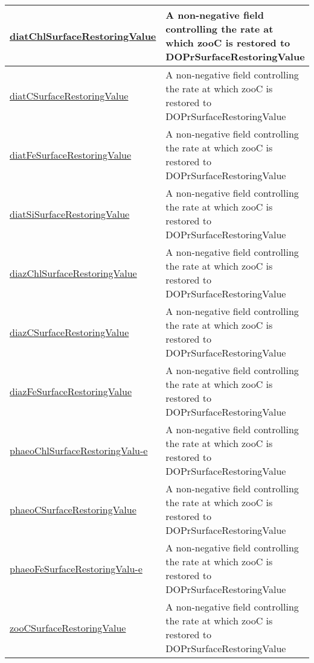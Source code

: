 {\begin{center}
\begin{longtable}{| p{2.0in} | p{4.0in} |}
    \hline
    \hyperref[subsec:var_sec_tracersSurfaceRestoringFields_diatChlSurfaceRestoringValue]{diatChlSurfaceRestoringValue} & A non-negative field controlling the rate at which zooC is restored to DOPrSurfaceRestoringValue \\
    \hline
    \hyperref[subsec:var_sec_tracersSurfaceRestoringFields_diatCSurfaceRestoringValue]{diatCSurfaceRestoringValue} & A non-negative field controlling the rate at which zooC is restored to DOPrSurfaceRestoringValue \\
    \hline
    \hyperref[subsec:var_sec_tracersSurfaceRestoringFields_diatFeSurfaceRestoringValue]{diatFeSurfaceRestoringValue} & A non-negative field controlling the rate at which zooC is restored to DOPrSurfaceRestoringValue \\
    \hline
    \hyperref[subsec:var_sec_tracersSurfaceRestoringFields_diatSiSurfaceRestoringValue]{diatSiSurfaceRestoringValue} & A non-negative field controlling the rate at which zooC is restored to DOPrSurfaceRestoringValue \\
    \hline
    \hyperref[subsec:var_sec_tracersSurfaceRestoringFields_diazChlSurfaceRestoringValue]{diazChlSurfaceRestoringValue} & A non-negative field controlling the rate at which zooC is restored to DOPrSurfaceRestoringValue \\
    \hline
    \hyperref[subsec:var_sec_tracersSurfaceRestoringFields_diazCSurfaceRestoringValue]{diazCSurfaceRestoringValue} & A non-negative field controlling the rate at which zooC is restored to DOPrSurfaceRestoringValue \\
    \hline
    \hyperref[subsec:var_sec_tracersSurfaceRestoringFields_diazFeSurfaceRestoringValue]{diazFeSurfaceRestoringValue} & A non-negative field controlling the rate at which zooC is restored to DOPrSurfaceRestoringValue \\
    \hline
    \hyperref[subsec:var_sec_tracersSurfaceRestoringFields_phaeoChlSurfaceRestoringValue]{phaeoChlSurfaceRestoringValu-}\hyperref[subsec:var_sec_tracersSurfaceRestoringFields_phaeoChlSurfaceRestoringValue]{e}  & A non-negative field controlling the rate at which zooC is restored to DOPrSurfaceRestoringValue \\
    \hline
    \hyperref[subsec:var_sec_tracersSurfaceRestoringFields_phaeoCSurfaceRestoringValue]{phaeoCSurfaceRestoringValue} & A non-negative field controlling the rate at which zooC is restored to DOPrSurfaceRestoringValue \\
    \hline
    \hyperref[subsec:var_sec_tracersSurfaceRestoringFields_phaeoFeSurfaceRestoringValue]{phaeoFeSurfaceRestoringValu-}\hyperref[subsec:var_sec_tracersSurfaceRestoringFields_phaeoFeSurfaceRestoringValue]{e}  & A non-negative field controlling the rate at which zooC is restored to DOPrSurfaceRestoringValue \\
    \hline
    \hyperref[subsec:var_sec_tracersSurfaceRestoringFields_zooCSurfaceRestoringValue]{zooCSurfaceRestoringValue} & A non-negative field controlling the rate at which zooC is restored to DOPrSurfaceRestoringValue \\
    \hline
\end{longtable}
\end{center}
}
